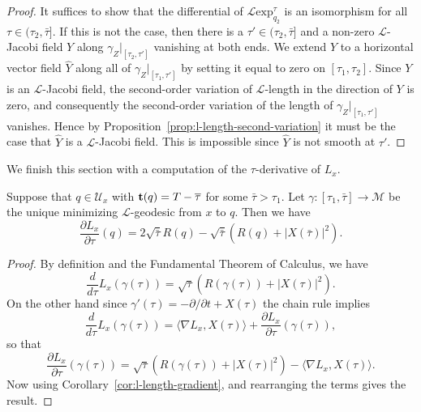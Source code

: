 \begin{proof}
\sketch
{}
It suffices to show that the differential of ${\mathcal L}\mathrm{exp}_{q_2}^\tau$ is an isomorphism for all $\tau\in
(\tau_2,\bar\tau]$. If this is not the case, then there is a
$\tau'\in (\tau_2,\bar\tau]$ and a non-zero ${\mathcal L}$-Jacobi
field $Y$ along $\gamma_Z|_{[\tau_2,\tau']}$ vanishing at both ends.
We extend $Y$ to a horizontal vector field $\widehat Y$ along all of
$\gamma_Z|_{[\tau_1,\tau']}$  by setting it equal to zero on
$[\tau_1,\tau_2]$. Since $Y$ is an ${\mathcal L}$-Jacobi field, the
second-order variation of ${\mathcal L}$-length in the direction of
$Y$ is zero, and consequently the second-order variation of the
length of $\gamma_Z|_{[\tau_1,\tau']}$ vanishes. Hence by
Proposition~\ref{prop:l-length-second-variation} it must be the case that $\widehat Y$ is a
${\mathcal L}$-Jacobi field. This is impossible since $\widehat Y$
is not smooth at $\tau'$.
\end{proof}



We finish this section with a computation of the $\tau$-derivative
of $L_x$.

\begin{lemma}\label{lem:l-length-tau-derivative}
\label{Ltau}

 Suppose that
$q\in  {\mathcal U}_x$ with ${\bf t}(q)=T-\bar\tau$ for some $\bar\tau>\tau_1$.
Let $\gamma\colon [\tau_1,\bar\tau]\to {\mathcal M}$ be the unique minimizing
${\mathcal L}$-geodesic from $x$ to $q$. Then we have
\begin{equation}\label{Ltaueqn}
\frac{\partial L_x}{\partial \tau}(q)=2\sqrt{\bar\tau}R(
q)-\sqrt{\bar\tau}\left(R( q)+|X(\bar\tau)|^2\right).
\end{equation}
\end{lemma}


\begin{proof}
\sketch
{}
By definition and the Fundamental Theorem of Calculus, we have
$$\frac{d}{d\tau}L_x(\gamma(\tau))= \sqrt{\tau}\left(R(\gamma(\tau))+|X(\tau)|^2\right).$$
On the other hand since $\gamma'(\tau)=-\partial/\partial t+X(\tau)$
the chain rule implies
$$\frac{d}{d\tau}L_x(\gamma(\tau))=\langle \nabla
L_x,X(\tau)\rangle+\frac{\partial L_x}{\partial
\tau}(\gamma(\tau)),$$ so that
$$\frac{\partial L_x}{\partial \tau}(\gamma(\tau))=\sqrt{\tau}\left(R(\gamma(\tau))+|X(\tau)|^2\right)-\langle\nabla
L_x,X(\tau)\rangle.$$ Now using Corollary~\ref{cor:l-length-gradient}, and rearranging
the terms gives the result.
\end{proof}



